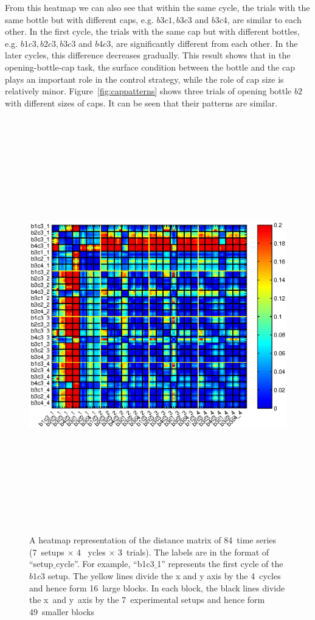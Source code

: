 From this heatmap we can also see that within the same
cycle, the trials with the same bottle but with different caps,
e.g. $b3c1, b3c3$ and $b3c4$, are similar to each other. In the first
cycle, the trials with the same cap but with different bottles,
e.g. $b1c3, b2c3, b3c3$ and $b4c3$, are significantly different from
each other. In the later cycles, this difference decreases
gradually. This result shows that in the opening-bottle-cap task, the
surface condition between the bottle and the cap plays an important
role in the control strategy, while the role of cap size is relatively
minor. Figure~\ref{fig:cappatterns} shows three trials of opening
bottle $b2$ with different sizes of caps. It can be seen that their
patterns are similar.

\begin{figure}
\label{heatmap}
  \centering
  \includegraphics[width=18cm,height=18cm]{./fig/heatmap_all6_3.eps}
  \caption{ \scriptsize{A heatmap representation of the distance
      matrix of 84~time series (7~setups $\times$ 4 ~ycles $\times$
      3~trials). The labels are in the format of
      ``setup$\_$cycle''. For example, ``b1c3$\_$1'' represents the
      first cycle of the $b1c3$ setup. The yellow lines divide the x
      and y axis by the 4~cycles and hence form 16~large blocks. In
      each block, the black lines divide the x~and y~axis by the
      7~experimental setups and hence form 49~smaller blocks }  }
\label{fig:heatmap}
\end{figure}

